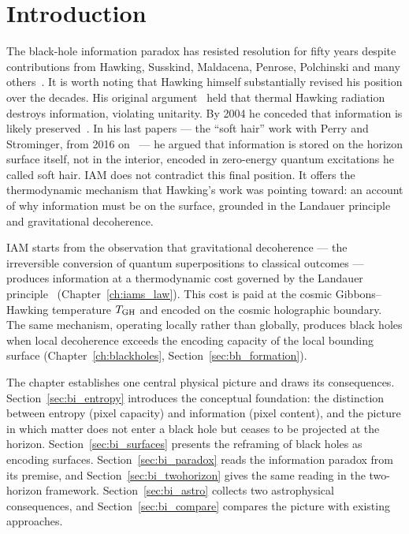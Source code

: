 \section{Introduction}\label{sec:bi_intro}
The black-hole information paradox has resisted resolution for fifty years despite contributions from Hawking, Susskind, Maldacena, Penrose, Polchinski and
many others~\cite{Hawking1976,Page1993,Maldacena1998,AMPS2013,MaldacenaSusskind2013,Penrose1989}. It is worth noting that Hawking himself substantially revised his position over the decades. His
original argument~\cite{Hawking1975,Hawking1976} held that thermal Hawking radiation destroys information, violating unitarity. By 2004 he conceded that information is likely
preserved~\cite{Hawking2005}. In his last papers --- the ``soft hair'' work with Perry and Strominger, from 2016 on~\cite{HawkingPerryStrominger2016} --- he argued that information is stored on the
horizon surface itself, not in the interior, encoded in zero-energy quantum excitations he called soft hair. IAM does not contradict this final position. It
offers the thermodynamic mechanism that Hawking's work was pointing toward: an account of why information must be on the surface, grounded in the Landauer
principle and gravitational decoherence. \interp

IAM starts from the observation that gravitational decoherence --- the irreversible conversion of quantum superpositions to classical outcomes --- produces
information at a thermodynamic cost governed by the Landauer principle~\cite{Landauer1961} (Chapter~\ref{ch:iams_law}). This cost is paid at the cosmic Gibbons--Hawking
temperature $T_{\rm GH}$ and encoded on the cosmic holographic boundary. The same mechanism, operating locally rather than globally, produces black holes when
local decoherence exceeds the encoding capacity of the local bounding surface (Chapter~\ref{ch:blackholes}, Section~\ref{sec:bh_formation}).

The chapter establishes one central physical picture and draws its consequences. Section~\ref{sec:bi_entropy} introduces the conceptual foundation: the distinction between
entropy (pixel capacity) and information (pixel content), and the picture in which matter does not enter a black hole but ceases to be projected at the
horizon. Section~\ref{sec:bi_surfaces} presents the reframing of black holes as encoding surfaces. Section~\ref{sec:bi_paradox} reads the information paradox from its premise,
and Section~\ref{sec:bi_twohorizon} gives the same reading in the two-horizon framework. Section~\ref{sec:bi_astro} collects two astrophysical consequences, and
Section~\ref{sec:bi_compare} compares the picture with existing approaches.

